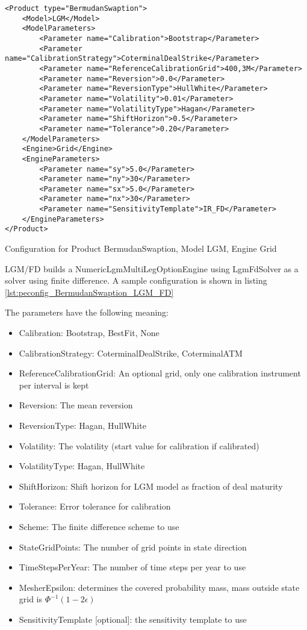 \begin{longlisting}
\begin{verbatim}
<Product type="BermudanSwaption">
    <Model>LGM</Model>
    <ModelParameters>
        <Parameter name="Calibration">Bootstrap</Parameter>
        <Parameter name="CalibrationStrategy">CoterminalDealStrike</Parameter>
        <Parameter name="ReferenceCalibrationGrid">400,3M</Parameter>
        <Parameter name="Reversion">0.0</Parameter>
        <Parameter name="ReversionType">HullWhite</Parameter>
        <Parameter name="Volatility">0.01</Parameter>
        <Parameter name="VolatilityType">Hagan</Parameter>
        <Parameter name="ShiftHorizon">0.5</Parameter>
        <Parameter name="Tolerance">0.20</Parameter>
    </ModelParameters>
    <Engine>Grid</Engine>
    <EngineParameters>
        <Parameter name="sy">5.0</Parameter>
        <Parameter name="ny">30</Parameter>
        <Parameter name="sx">5.0</Parameter>
        <Parameter name="nx">30</Parameter>
        <Parameter name="SensitivityTemplate">IR_FD</Parameter>
    </EngineParameters>
</Product>
\end{verbatim}
\caption{Configuration for Product BermudanSwaption, Model LGM, Engine Grid}
\label{lst:peconfig_BermudanSwaption_LGM_Grid}
\end{longlisting}

LGM/FD builds a NumericLgmMultiLegOptionEngine using LgmFdSolver as a solver using finite difference. A sample
configuration is shown in listing \ref{lst:peconfig_BermudanSwaption_LGM_FD}

The parameters have the following meaning:

\begin{itemize}
\item Calibration: Bootstrap, BestFit, None
\item CalibrationStrategy: CoterminalDealStrike, CoterminalATM
\item ReferenceCalibrationGrid: An optional grid, only one calibration instrument per interval is kept
\item Reversion: The mean reversion
\item ReversionType: Hagan, HullWhite
\item Volatility: The volatility (start value for calibration if calibrated)
\item VolatilityType: Hagan, HullWhite
\item ShiftHorizon: Shift horizon for LGM model as fraction of deal maturity
\item Tolerance: Error tolerance for calibration
\item Scheme: The finite difference scheme to use
\item StateGridPoints: The number of grid points in state direction
\item TimeStepsPerYear: The number of time steps per year to use
\item MesherEpsilon: determines the covered probability mass, mass outside state grid is $\Phi^{-1}(1-2\epsilon)$
\item SensitivityTemplate [optional]: the sensitivity template to use 
\end{itemize}

